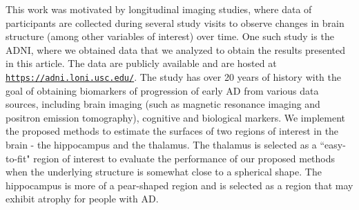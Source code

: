 \documentclass[12pt]{article}
\theoremstyle{definition}
\begin{document}


This work was motivated by longitudinal imaging studies, where data of participants are collected during several study visits to observe changes in brain structure (among other variables of interest) over time. One such study is the ADNI, where we obtained data that we analyzed to obtain the results presented in this article. The data are publicly available and are hosted at \href{https://adni.loni.usc.edu/}{\texttt{https://adni.loni.usc.edu/}}. The study has over 20 years of history with the goal of obtaining biomarkers of progression of early AD from various data sources, including brain imaging (such as magnetic resonance imaging and positron emission tomography), cognitive and biological markers. We implement the proposed methods to estimate the surfaces of two regions of interest in the brain - the hippocampus and the thalamus. The thalamus is selected as a ``easy-to-fit" region of interest to evaluate the performance of our proposed methods when the underlying structure is somewhat close to a spherical shape. The hippocampus is more of a pear-shaped region and is selected as a region that may exhibit atrophy for people with AD. 
\end{document}
